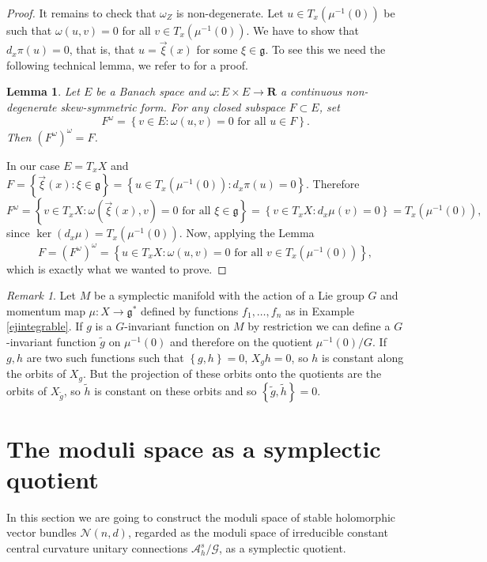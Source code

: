 \documentclass[12pt,a4paper]{book}
\newtheorem{lema}[thm]{Lemma}
\theoremstyle{definition} \newtheorem{defn}[thm]{Definition}
\theoremstyle{definition} \newtheorem{ejemplo}[thm]{Example}
\theoremstyle{remark} \newtheorem{rem}[thm]{Remark}
\def\AA{\mathscr{A}}
\def\GG{\mathscr{G}}
\def\gg{\mathfrak{g}}
\def\RR{\mathbf{R}}
\def\Bun{\mathscr{N}}
\begin{document}
\begin{proof}
      It remains to check that $\omega_Z$ is non-degenerate. Let $u\in T_x(\mu^{-1}(0))$ be such that $\omega(u,v)=0$ for all $v\in T_x(\mu^{-1}(0))$. We have to show that $d_x\pi(u)=0$, that is, that $u=\vec{\xi}(x)$ for some $\xi\in \gg$. To see this we need the following technical lemma, we refer to \cite{kobayashi} for a proof.
      \begin{lema}
	Let $E$ be a Banach space and $\omega:E\times E \rightarrow \RR$ a continuous non-degenerate skew-symmetric form. For any closed subspace $F\subset E$, set
	\begin{equation*}
	  F^\omega=\left\{ v\in E:\omega(u,v)=0 \text{ for all } u \in F \right\}.
	\end{equation*}
	Then $(F^\omega)^\omega=F$.
      \end{lema}

      In our case $E=T_xX$ and $F=\left\{ \vec{\xi}(x) : \xi \in \gg \right\}=\left\{ u \in T_x(\mu^{-1}(0)) : d_x\pi(u)=0 \right\}$. Therefore
      \begin{equation*}
	F^\omega=\left\{ v\in T_xX: \omega(\vec{\xi}(x),v)=0 \text{ for all } \xi \in \gg \right\}=\left\{ v\in T_xX: d_x\mu(v)=0 \right\}=T_x(\mu^{-1}(0)),
      \end{equation*}
      since $\ker(d_x\mu)=T_x(\mu^{-1}(0))$. Now, applying the Lemma
      \begin{equation*}
	F=(F^\omega)^\omega=\left\{ u\in T_x X: \omega(u,v)=0 \text{ for all } v\in T_x(\mu^{-1}(0)) \right\},
      \end{equation*}
     which is exactly what we wanted to prove.
    \end{proof}

    \begin{rem}
      Let $M$ be a symplectic manifold with the action of a Lie group $G$ and momentum map $\mu:X\rightarrow \gg^*$ defined by functions $f_1,\dots,f_n$ as in Example \ref{ejintegrable}. If $g$ is a $G$-invariant function on $M$ by restriction we can define a $G$-invariant function $\tilde{g}$ on $\mu^{-1}(0)$ and therefore on the quotient $\mu^{-1}(0)/G$. If $g,h$ are two such functions such that $\left\{ g,h \right\}=0$, $X_gh=0$, so $h$ is constant along the orbits of $X_g$. But the projection of these orbits onto the quotients are the orbits of $X_{\tilde{g}}$, so $\tilde{h}$ is constant on these orbits and so $\left\{ \tilde{g},\tilde{h} \right\}=0$.
    \end{rem}

    \section{The moduli space as a symplectic quotient}
In this section we are going to construct the moduli space of stable holomorphic vector bundles $\Bun(n,d)$, regarded as the moduli space of irreducible constant central curvature unitary connections $\AA^s_h/\GG$, as a symplectic quotient. 
\end{document}
